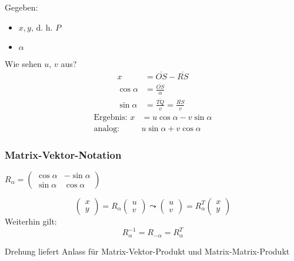 Gegeben:
\begin{itemize}
	\item $x, y$, d. h. $P$
	\item $\alpha$
\end{itemize}
%
Wie sehen $u$, $v$ aus?
%
\begin{align*}
x &= \overline{OS} - \overline{RS} \\
\cos \alpha &= \frac{\overline{OS}}{\alpha} \\
\sin \alpha &= \frac{\overline{TQ}}{v} = \frac{\overline{RS}}{v}
\end{align*}
%
\begin{align*}
\text{Ergebnis: } x &= u \cos \alpha - v \sin \alpha \\
\text{analog: } &u \sin \alpha + v \cos \alpha
\end{align*}

\subsubsection*{Matrix-Vektor-Notation}

\begin{definition}
	$ R_{\alpha} =
	\begin{pmatrix}
		\cos \alpha & -\sin \alpha \\
		\sin \alpha & \cos \alpha
 	\end{pmatrix}$
\end{definition}

\begin{equation*}
	\begin{pmatrix}
		x \\
		y
 	\end{pmatrix} = R_{\alpha} 
 	\begin{pmatrix}
		u \\
		v
 	\end{pmatrix}
 	\leadsto
 		\begin{pmatrix}
		u \\
		v
 	\end{pmatrix} = R_{\alpha}^{T}
 	\begin{pmatrix}
		x \\
		y
 	\end{pmatrix}
\end{equation*}
%
Weiterhin gilt:
\begin{equation*}
	R_{\alpha}^{-1} = R_{-\alpha} = R_{\alpha}^{T}
\end{equation*}

\begin{note}
Drehung liefert Anlass für Matrix-Vektor-Produkt und Matrix-Matrix-Produkt
\end{note}

